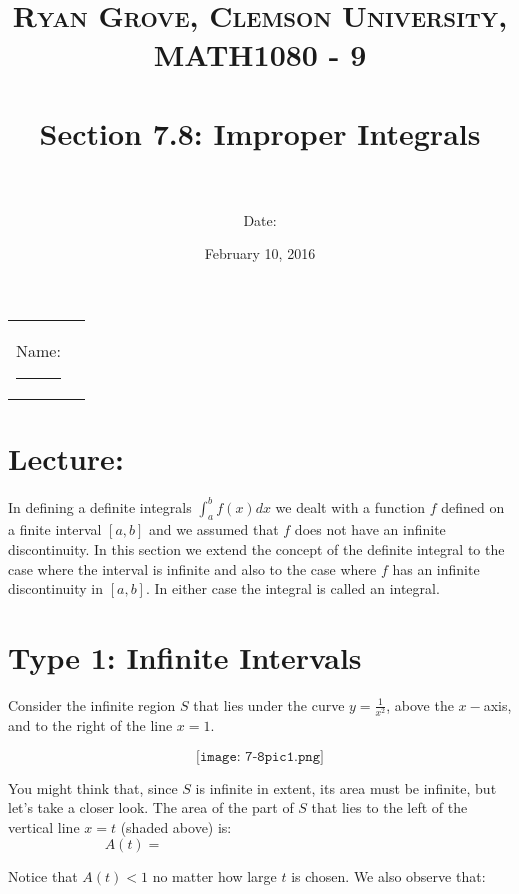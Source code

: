 \documentclass[paper=a4, fontsize=11pt]{scrartcl} %
\title{	
\normalfont \normalsize 
\textsc{Ryan Grove, Clemson University, MATH1080 - 9} \\ [25pt] %
\horrule{0.5pt} \\[0.4cm] %
\huge Section 7.8: Improper Integrals \\ %
\horrule{2pt} \\[0.5cm] %
}
\author{Date:} %
\date{\normalsize February 10, 2016} %
\numberwithin{equation}{section} %
\numberwithin{figure}{section} %
\numberwithin{table}{section} %
\newcommand{\ds}{\displaystyle}
\begin{document}
\maketitle %

\begin{flushleft}
\begin{tabular}{l l}
Name: \rule{3.2in}{.01cm}  & {}%
\end{tabular}
\end{flushleft}


\section*{\textbf{Lecture:}}

In defining a definite integrals $\ds\int_a^b f(x)dx$ we dealt with a function $f$ defined on a finite interval $[a,b]$ and we assumed that $f$ does not have an infinite discontinuity. In this section we extend the concept of the definite integral to the case where the interval is infinite and also to the case where $f$ has an infinite discontinuity in $[a,b]$. In either case the integral is called an \underline{\hspace{1.25in}} integral.\\

\section*{Type 1: Infinite Intervals}
Consider the infinite region $S$ that lies under the curve $y=\ds\frac{1}{x^2}$, above the $x-$axis, and to the right of the line $x=1$.

\[\texttt{[image: 7-8pic1.png]}\]

You might think that, since $S$ is infinite in extent, its area must be infinite, but let's take a closer look. The area of the part of $S$ that lies to the left of the vertical line $x=t$ (shaded above) is:\\

\[A(t) = \hspace{3in}\]
\indent

Notice that $A(t)<1$ no matter how large $t$ is chosen. We also observe that:
\end{document}

